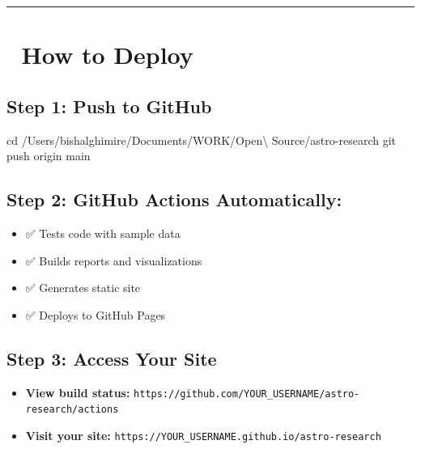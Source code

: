 \documentclass[
  11pt,
  oneside,
  openany]{scrbook}
\newenvironment{Shaded}{\begin{snugshade}}{\end{snugshade}}
\newcommand{\BuiltInTok}[1]{\textcolor[rgb]{0.00,0.23,0.31}{#1}}
\newcommand{\FunctionTok}[1]{\textcolor[rgb]{0.28,0.35,0.67}{#1}}
\newcommand{\NormalTok}[1]{\textcolor[rgb]{0.00,0.23,0.31}{#1}}
\providecommand{\tightlist}{%
  \setlength{\itemsep}{0pt}\setlength{\parskip}{0pt}}\usepackage{longtable,booktabs,array}
\begin{document}
\begin{center}\rule{0.5\linewidth}{0.5pt}\end{center}

\chapter{🚀 How to Deploy}\label{how-to-deploy}

\section{\texorpdfstring{\textbf{Step 1: Push to
GitHub}}{Step 1: Push to GitHub}}\label{step-1-push-to-github}

\begin{Shaded}
\begin{Highlighting}[]
\BuiltInTok{cd}\NormalTok{ /Users/bishalghimire/Documents/WORK/Open\textbackslash{} Source/astro{-}research}
\FunctionTok{git}\NormalTok{ push origin main}
\end{Highlighting}
\end{Shaded}

\section{\texorpdfstring{\textbf{Step 2: GitHub Actions
Automatically:}}{Step 2: GitHub Actions Automatically:}}\label{step-2-github-actions-automatically}

\begin{itemize}
\tightlist
\item
  ✅ Tests code with sample data
\item
  ✅ Builds reports and visualizations
\item
  ✅ Generates static site
\item
  ✅ Deploys to GitHub Pages
\end{itemize}

\section{\texorpdfstring{\textbf{Step 3: Access Your
Site}}{Step 3: Access Your Site}}\label{step-3-access-your-site}

\begin{itemize}
\tightlist
\item
  \textbf{View build status:}
  \texttt{https://github.com/YOUR\_USERNAME/astro-research/actions}
\item
  \textbf{Visit your site:}
  \texttt{https://YOUR\_USERNAME.github.io/astro-research}
\end{itemize}
\end{document}
